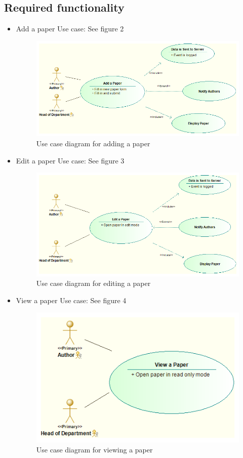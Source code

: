 \documentclass[english]{article}
\begin{document}
		\subsection{Required functionality}
			\begin{itemize}
				\item	Add a paper Use case: See figure 2
					\begin{figure}[!h]
						\includegraphics[width=\linewidth]{Add A Paper Use Case}
						\caption{Use case diagram for adding a paper}				
					\end{figure}
				\item   Edit a paper Use case: See figure 3
					\begin{figure}[!h]
						\includegraphics[width=\linewidth]{Edit a Paper Use Case}
						\caption{Use case diagram for editing a paper}				
					\end{figure}
				\item   View a paper Use case: See figure 4		
					\begin{figure}[!h]
						\includegraphics[width=\linewidth]{View a paper Use Case}
						\caption{Use case diagram for viewing a paper}
					\end{figure}									
			\end{itemize}
\end{document}
